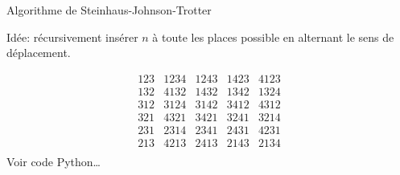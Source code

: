 \documentclass{beamer}
\begin{document}
\begin{frame}{Algorithme de Steinhaus-Johnson-Trotter}

  \begin{NOTE}
    Idée: récursivement insérer $n$ à toute les places possible en alternant
    le sens de déplacement.
  \end{NOTE}
  \bigskip
  \[\begin{array}{c||cccc}
   123 &  1234 & 1243 & 1423 & 4123 \\
   132 &  4132 & 1432 & 1342 & 1324 \\
   312 &  3124 & 3142 & 3412 & 4312 \\
   321 &  4321 & 3421 & 3241 & 3214 \\
   231 &  2314 & 2341 & 2431 & 4231 \\
   213 &  4213 & 2413 & 2143 & 2134 \\
  \end{array}\]
  Voir code Python\dots
\end{frame}
\end{document}

